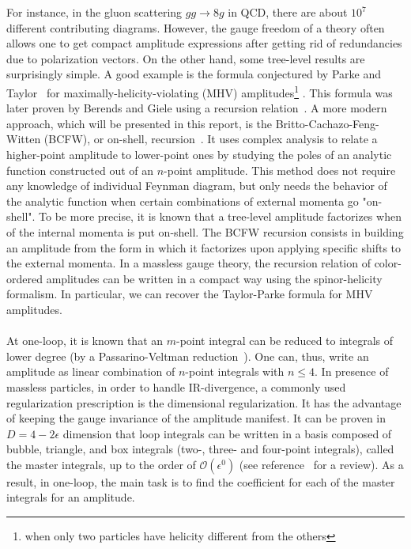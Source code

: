 For instance, in the gluon scattering $gg\rightarrow 8g$ in QCD, there are about $10^7$ different contributing diagrams.
However, the gauge freedom of a theory often allows one to get compact amplitude expressions after getting rid of redundancies due to polarization vectors.
On the other hand, some tree-level results are surprisingly simple.
A good example is the formula conjectured by Parke and Taylor~\cite{PhysRevLett.56.2459} for maximally-helicity-violating (MHV) amplitudes\footnote{
\ie when only two particles have helicity different from the others
}
.
This formula was later proven by Berends and Giele using a recursion relation~\cite{BERENDS1988759,KOSOWER199023}.
A more modern approach, which will be presented in this report, is the Britto-Cachazo-Feng-Witten (BCFW), or on-shell, recursion~\cite{BRITTO2005499, PhysRevLett.94.181602}.
It uses complex analysis to relate a higher-point amplitude to lower-point ones by studying the poles of an analytic function constructed out of an $n$-point amplitude.
This method does not require any knowledge of individual Feynman diagram, but only needs the behavior of the analytic function when certain combinations of external momenta go "on-shell". 
To be more precise, it is known that a tree-level amplitude factorizes when of the internal momenta is put on-shell.
The BCFW recursion consists in building an amplitude from the form in which it factorizes upon applying specific shifts to the external momenta.
In a massless gauge theory, the recursion relation of color-ordered amplitudes can be written in a compact way using the spinor-helicity formalism.
In particular, we can recover the Taylor-Parke formula for MHV amplitudes.
\\\\
At one-loop,
it is known that an $m$-point integral can be reduced to integrals of lower degree (\eg by a Passarino-Veltman reduction~\cite{PASSARINO1979151}). 
One can, thus, write an amplitude as linear combination of $n$-point integrals with $n\leq 4$.
In presence of massless particles, in order to handle IR-divergence, a commonly used regularization prescription is the dimensional regularization.
It has the advantage of keeping the gauge invariance of the amplitude manifest.
It can be proven in $D = 4-2\epsilon$ dimension that loop integrals can be written in a basis composed of bubble, triangle, and box integrals (\ie two-, three- and four-point integrals), called the master integrals, up to the order of $\mathcal{O}(\epsilon^0)$ (see \eg reference~\cite{Gluza:2010ws} for a review).
As a result, in one-loop, the main task is to find the coefficient for each of the master integrals for an amplitude.
